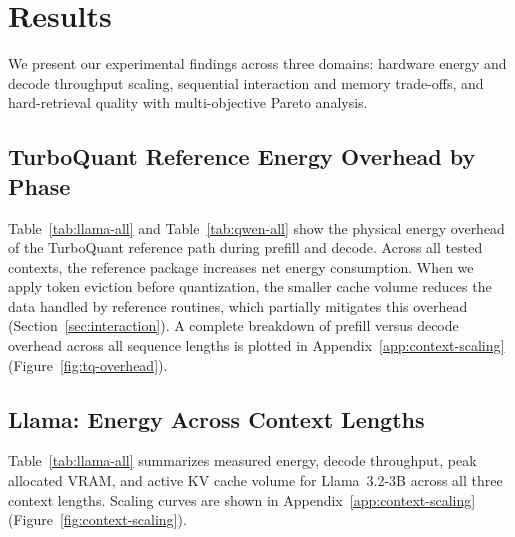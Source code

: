 \documentclass[sigconf,nonacm]{acmart}
\begin{document}
\section{Results}

We present our experimental findings across three domains: hardware energy and decode throughput scaling, sequential interaction and memory trade-offs, and hard-retrieval quality with multi-objective Pareto analysis.

\subsection{TurboQuant Reference Energy Overhead by Phase}

Table~\ref{tab:llama-all} and Table~\ref{tab:qwen-all} show the physical energy overhead of the TurboQuant reference path during prefill and decode. Across all tested contexts, the reference package increases net energy consumption. When we apply token eviction before quantization, the smaller cache volume reduces the data handled by reference routines, which partially mitigates this overhead (Section~\ref{sec:interaction}). A complete breakdown of prefill versus decode overhead across all sequence lengths is plotted in Appendix~\ref{app:context-scaling} (Figure~\ref{fig:tq-overhead}).

\subsection{Llama: Energy Across Context Lengths}
\label{sec:llama-energy}

Table~\ref{tab:llama-all} summarizes measured energy, decode throughput, peak allocated VRAM, and active KV cache volume for Llama~3.2-3B across all three context lengths. Scaling curves are shown in Appendix~\ref{app:context-scaling} (Figure~\ref{fig:context-scaling}).
\end{document}
